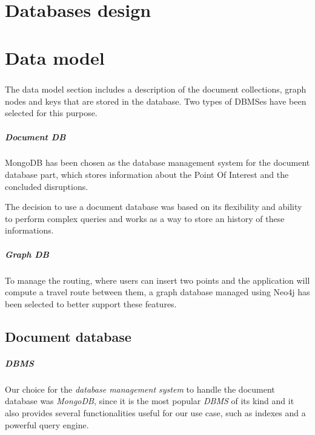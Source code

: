 \chapter{Databases design}

%

\chapter{Data model}

\paragraph{}
The data model section includes a description of the document collections, 
graph nodes and keys that are stored in the database. Two types of DBMSes have 
been selected for this purpose. 

\paragraph{Document DB}
MongoDB has been chosen as the database management system for the document 
database part, which stores information about the Point Of Interest and the 
concluded disruptions.

The decision to use a document database was based on its flexibility and 
ability to perform complex queries and works as a way to store an history of 
these informations.

\paragraph{Graph DB}
To manage the routing, where users can insert two points and the application will compute a travel route between them, a graph database managed using Neo4j has been selected to better support these features.

\section{Document database}

\paragraph{DBMS} Our choice for the \textit{database management system} to 
handle the document database was \textit{MongoDB}, since it is the most popular 
\textit{DBMS} of its kind and it also provides several functionalities useful 
for our use case, such as indexes and a powerful query engine.

